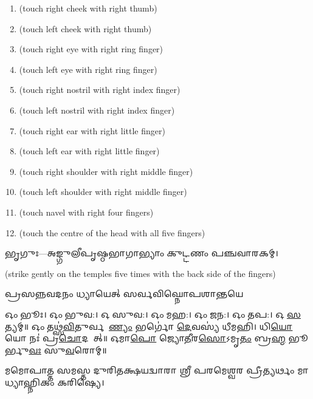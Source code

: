 \begin{enumerate}
    \item {} {\scriptsize (touch right cheek with right thumb)}
    \item {} {\scriptsize (touch left cheek with right thumb)}
    \item {} {\scriptsize (touch right eye with right ring finger)}
    \item {} {\scriptsize (touch left eye with right ring finger)}
    \item {} {\scriptsize (touch right nostril with right index finger)}
    \item {} {\scriptsize (touch left nostril with right index finger)}
    \item {} {\scriptsize (touch right ear with right little finger)}
    \item {} {\scriptsize (touch left ear with right little finger)}
    \item {} {\scriptsize (touch right shoulder with right middle finger)}
    \item {} {\scriptsize (touch left shoulder with right middle finger)}
    \item {} {\scriptsize (touch navel with right four fingers)}
    \item {} {\scriptsize (touch the centre of the head with all five fingers)}
\end{enumerate}



𑌭𑍃𑌗𑍁𑌃—𑌅𑌙𑍍𑌗𑍁𑌲𑍀𑌪𑍃𑌷𑍍𑌠𑌭𑌾𑌗𑌾𑌭𑍍𑌯𑌾𑌂 𑌕𑍁𑌟𑍍𑌟𑌣𑌂 𑌪𑌞𑍍𑌚𑌵𑌾𑌰𑌕𑌮𑍍।

{\scriptsize (strike gently on the temples five times with the back side of the fingers)}

{𑌪𑍍𑌰𑌸𑌨𑍍𑌨𑌵𑌦𑌨𑌂 𑌧𑍍𑌯𑌾𑌯𑍇𑌤𑍍 𑌸𑌰𑍍𑌵𑌵𑌿𑌘𑍍𑌨𑍋𑌪𑌶𑌾𑌨𑍍𑌤𑌯𑍇}


𑌓𑌂 𑌭𑍂𑌃। 𑌓𑌂 𑌭𑍁𑌵:। 𑌓 𑌸𑍁𑌵:। 𑌓𑌂 𑌮𑌹:। 𑌓𑌂 𑌜𑌨:। 𑌓𑌂 𑌤𑌪:। 𑌓 \ul{𑌸}𑌤𑍍𑌯𑌮𑍍॥
𑌓𑌂 𑌤𑌥𑍍𑌸॑\ul{𑌵𑌿}𑌤𑍁𑌰𑍍𑌵𑌰𑍇᳚\ul{𑌣𑍍𑌯𑌂} 𑌭𑌰𑍍𑌗𑍋॑ \ul{𑌦𑍇}𑌵𑌸𑍍𑌯॑ 𑌧𑍀𑌮𑌹𑌿। 𑌧𑌿\ul{𑌯𑍋} 𑌯𑍋 𑌨𑌃॑ 𑌪𑍍𑌰\ul{𑌚𑍋}𑌦𑌯𑌾᳚𑌤𑍍॥
𑌓𑌮𑌾\ul{𑌪𑍋} 𑌜𑍍𑌯𑍋\ul{𑌤𑍀}𑌰\ul{𑌸𑍋}𑌽𑌮𑍃\ul{𑌤𑌂} 𑌬𑍍𑌰\ul{𑌹𑍍𑌮} 𑌭𑍂𑌰𑍍𑌭𑍁\ul{𑌵𑌃} 𑌸𑍁\ul{𑌵}𑌰𑍋𑌮𑍍॥


𑌮𑌮𑍋𑌪𑌾𑌤𑍍𑌤 𑌸𑌮𑌸𑍍𑌤 𑌦𑍁𑌰𑌿𑌤𑌕𑍍𑌷𑌯𑌦𑍍𑌵𑌾𑌰𑌾 𑌶𑍍𑌰𑍀 𑌪𑌰𑌮𑍇𑌶𑍍𑌵𑌰 𑌪𑍍𑌰𑍀𑌤𑍍𑌯𑌰𑍍𑌥𑌂 𑌮𑌾𑌧𑍍𑌯𑌾𑌹𑍍𑌨𑌿𑌕𑌂 𑌕𑌰𑌿𑌷𑍍𑌯𑍇।

